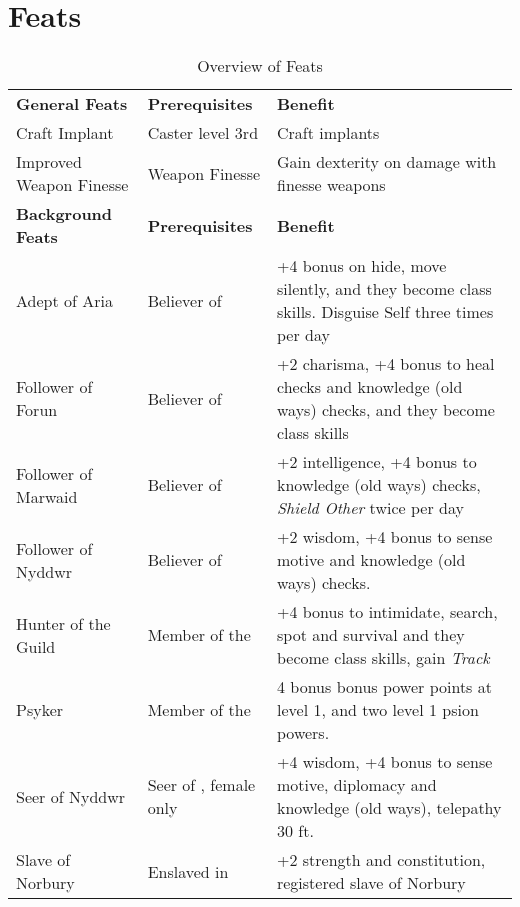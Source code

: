 \section{Feats}
\label{sec:Feats}

\begin{table*}[!htb]
  \caption{Overview of Feats}
  \begin{tabular}{l l p{7cm}}
    \textbf{General Feats}    & \textbf{Prerequisites}           & \textbf{Benefit} \\
    Craft Implant             & Caster level 3rd                 & Craft implants \\
    Improved Weapon Finesse   & Weapon Finesse                   & Gain dexterity on damage with finesse weapons \\
    \textbf{Background Feats} & \textbf{Prerequisites}           & \textbf{Benefit} \\
    Adept of Aria             & Believer of \nameref{sec:Aria}   & +4 bonus on hide, move silently, and they become class skills. Disguise Self three times per day \\
    Follower of Forun         & Believer of \nameref{sec:Forun}  & +2 charisma, +4 bonus to heal checks and knowledge (old ways) checks, and they become class skills \\
    Follower of Marwaid       & Believer of \nameref{sec:Marwaid}& +2 intelligence, +4 bonus to knowledge (old ways) checks, \emph{Shield Other} twice per day \\
    Follower of Nyddwr        & Believer of \nameref{sec:Nyddwr} & +2 wisdom, +4 bonus to sense motive and knowledge (old ways) checks. \\
    Hunter of the Guild       & Member of the \nameref{sec:Hunters Guild} & +4 bonus to intimidate, search, spot and survival and they become class skills, gain \emph{Track} \\
    Psyker                    & Member of the \nameref{sec:Helemic Order} & 4 bonus bonus power points at level 1, and two level 1 psion powers. \\
    Seer of Nyddwr            & Seer of \nameref{sec:Nyddwr}, female only & +4 wisdom, +4 bonus to sense motive, diplomacy and knowledge (old ways), telepathy 30 ft. \\
    Slave of Norbury          & Enslaved in \nameref{sec:Norbury}& +2 strength and constitution, registered slave of Norbury \\

\end{tabular}
\end{table*}
